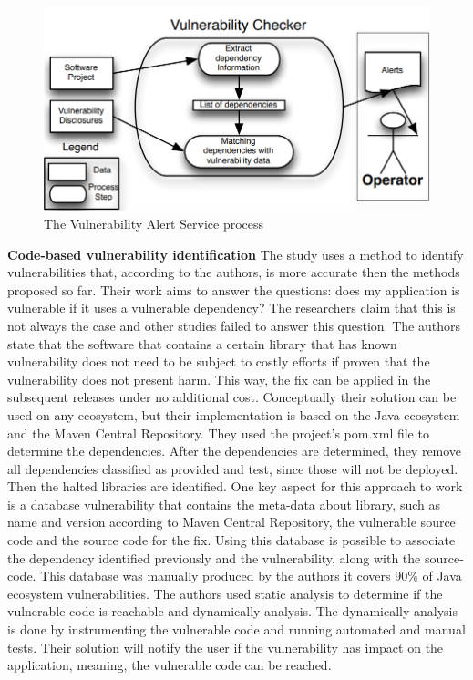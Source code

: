 \documentclass[pdf,bookmarks,colorlinks=true]{IEEEtran}
\begin{document}
\begin{figure}[h]
	\centering
	\includegraphics[scale=0.28]{VASProcess.png}
	\caption{The Vulnerability Alert Service process}
	\label{VASProcess}
\end{figure}


\textbf{Code-based vulnerability identification}
The study \cite{Ponta2018} uses a method to identify vulnerabilities that, according to the authors, is more accurate then the methods proposed so far. Their work aims to answer the questions: does my application is vulnerable if it uses a vulnerable dependency? The researchers claim that this is not always the case and other studies failed to answer this question. The authors state that the software that contains a certain library that has known vulnerability does not need to be subject to costly efforts if proven that the vulnerability does not present harm. This way, the fix can be applied in the subsequent releases under no additional cost. Conceptually their solution can be used on any ecosystem, but their implementation is based on the Java ecosystem and the Maven Central Repository. They used the project’s pom.xml file to determine the dependencies. After the dependencies are determined, they remove all dependencies classified as provided and test, since those will not be deployed. Then the halted libraries are identified. 
One key aspect for this approach to work is a database vulnerability that contains the meta-data about library, such as name and version according to Maven Central Repository, the vulnerable source code and the source code for the fix. Using this database is possible to associate the dependency identified previously and the vulnerability, along with the source-code. This database was manually produced by the authors it covers 90\% of Java ecosystem vulnerabilities.
The authors used static analysis to determine if the vulnerable code is reachable and dynamically analysis. The dynamically analysis is done by instrumenting the vulnerable code and running automated and manual tests.
Their solution will notify the user if the vulnerability has impact on the application, meaning, the vulnerable code can be reached.
\end{document}
